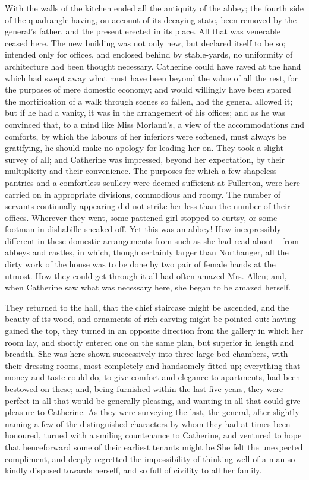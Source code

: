 With the walls of the kitchen ended all the antiquity of the abbey; the fourth side of the quadrangle having, on account of its decaying state, been removed by the general's father, and the present erected in its place. All that was venerable ceased here. The new building was not only new, but declared itself to be so; intended only for offices, and enclosed behind by stable-yards, no uniformity of architecture had been thought necessary. Catherine could have raved at the hand which had swept away what must have been beyond the value of all the rest, for the purposes of mere domestic economy; and would willingly have been spared the mortification of a walk through scenes so fallen, had the general allowed it; but if he had a vanity, it was in the arrangement of his offices; and as he was convinced that, to a mind like Miss Morland's, a view of the accommodations and comforts, by which the labours of her inferiors were softened, must always be gratifying, he should make no apology for leading her on. They took a slight survey of all; and Catherine was impressed, beyond her expectation, by their multiplicity and their convenience. The purposes for which a few shapeless pantries and a comfortless scullery were deemed sufficient at Fullerton, were here carried on in appropriate divisions, commodious and roomy. The number of servants continually appearing did not strike her less than the number of their offices. Wherever they went, some pattened girl stopped to curtsy, or some footman in dishabille sneaked off. Yet this was an abbey! How inexpressibly different in these domestic arrangements from such as she had read about---from abbeys and castles, in which, though certainly larger than Northanger, all the dirty work of the house was to be done by two pair of female hands at the utmost. How they could get through it all had often amazed Mrs. Allen; and, when Catherine saw what was necessary here, she began to be amazed herself.

They returned to the hall, that the chief staircase might be ascended, and the beauty of its wood, and ornaments of rich carving might be pointed out: having gained the top, they turned in an opposite direction from the gallery in which her room lay, and shortly entered one on the same plan, but superior in length and breadth. She was here shown successively into three large bed-chambers, with their dressing-rooms, most completely and handsomely fitted up; everything that money and taste could do, to give comfort and elegance to apartments, had been bestowed on these; and, being furnished within the last five years, they were perfect in all that would be generally pleasing, and wanting in all that could give pleasure to Catherine. As they were surveying the last, the general, after slightly naming a few of the distinguished characters by whom they had at times been honoured, turned with a smiling countenance to Catherine, and ventured to hope that henceforward some of their earliest tenants might be  She felt the unexpected compliment, and deeply regretted the impossibility of thinking well of a man so kindly disposed towards herself, and so full of civility to all her family.

